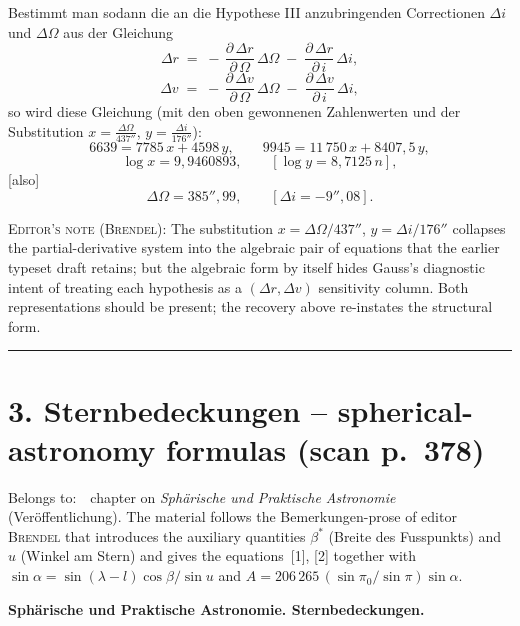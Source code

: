 \documentclass[10pt,a4paper]{article}
\begin{document}
\smallskip
Bestimmt man sodann die an die Hypothese III anzubringenden
Cor\-rec\-tio\-nen $\Delta i$ und $\Delta\Omega$ aus der Gleichung
\[
\Delta r \;=\; -\,\frac{\partial\,\Delta r}{\partial\,\Omega}\,\Delta\Omega
              \;-\;\frac{\partial\,\Delta r}{\partial\,i}\,\Delta i,
\]
\[
\Delta v \;=\; -\,\frac{\partial\,\Delta v}{\partial\,\Omega}\,\Delta\Omega
              \;-\;\frac{\partial\,\Delta v}{\partial\,i}\,\Delta i,
\]
\noindent so wird diese Gleichung (mit den oben gewonnenen
Zahlenwerten und der Substitution
$x = \tfrac{\Delta\Omega}{437''}$, $y = \tfrac{\Delta i}{176''}$):
\[
6639 = 7785\,x + 4598\,y, \qquad 9945 = 11\,750\,x + 8407{,}5\,y,
\]
\[
\log x = 9{,}9460893, \qquad [\log y = 8{,}7125\,n],
\]
[also]
\[
\Delta\Omega = 385''\!\!,\!99, \qquad [\Delta i = -9''\!\!,\!08].
\]

\textsf{\footnotesize\textsc{Editor's note (Brendel):} The substitution
$x = \Delta\Omega/437''$, $y = \Delta i/176''$ collapses the
partial-derivative system into the algebraic pair of equations that
the earlier typeset draft retains; but the algebraic form by itself
hides Gauss's diagnostic intent of treating each hypothesis as a
$(\Delta r,\Delta v)$ sensitivity column. Both representations should be
present; the recovery above re-instates the structural form.}

\bigskip\hrule\bigskip

\section*{3. Sternbedeckungen -- spherical-astronomy formulas \hfill (scan p.~378)}


\noindent\textsf{\small Belongs to:}~~chapter on \textit{Sph\"arische und
Praktische Astronomie} (Ver\"offentlichung). The material follows the
Bemerkungen-prose of editor \textsc{Brendel} that introduces the
auxiliary quantities $\beta^{\!*}$ (Breite des Fusspunkts) and $u$
(Winkel am Stern) and gives the equations~[1], [2] together with
$\sin\alpha=\sin(\lambda-l)\cos\beta/\sin u$ and
$A=206\,265\,(\sin\pi_{0}/\sin\pi)\sin\alpha$.

\medskip
\noindent\textbf{Sph\"arische und Praktische Astronomie. \quad Sternbedeckungen.}
\smallskip
\end{document}
